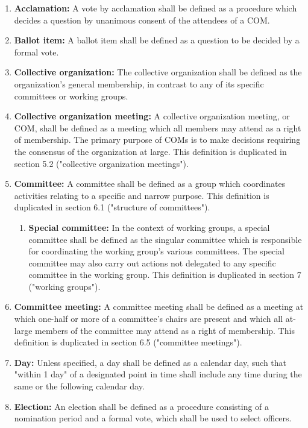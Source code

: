 \documentclass[11pt]{article}
\newcounter{h1}
\newcounter{h2}[h1]
\newcounter{h3}[h2]
\begin{document}

\begin{enumerate}
  \item \textbf{Acclamation:} A vote by acclamation shall be defined as a procedure which decides a question by unanimous consent of the attendees of a COM.
  \item \textbf{Ballot item:} A ballot item shall be defined as a question to be decided by a formal vote.
  \item \textbf{Collective organization:} The collective organization shall be defined as the organization's general membership, in contrast to any of its specific committees or working groups.
  \item \textbf{Collective organization meeting:} A collective organization meeting, or COM, shall be defined as a meeting which all members may attend as a right of membership. The primary purpose of COMs is to make decisions requiring the consensus of the organization at large. This definition is duplicated in section 5.2 ("collective organization meetings").
  \item \textbf{Committee:} A committee shall be defined as a group which coordinates activities relating to a specific and narrow purpose. This definition is duplicated in section 6.1 ("structure of committees").
  \begin{enumerate}
    \item \textbf{Special committee:} In the context of working groups, a special committee shall be defined as the singular committee which is responsible for coordinating the working group's various committees. The special committee may also carry out actions not delegated to any specific committee in the working group. This definition is duplicated in section 7 ("working groups").
  \end{enumerate}
  \item \textbf{Committee meeting:} A committee meeting shall be defined as a meeting at which one-half or more of a committee's chairs are present and which all at-large members of the committee may attend as a right of membership. This definition is duplicated in section 6.5 ("committee meetings").
  \item \textbf{Day:} Unless specified, a day shall be defined as a calendar day, such that "within 1 day" of a designated point in time shall include any time during the same or the following calendar day.
  \item \textbf{Election:} An election shall be defined as a procedure consisting of a nomination period and a formal vote, which shall be used to select officers.

\end{enumerate}
\end{document}
